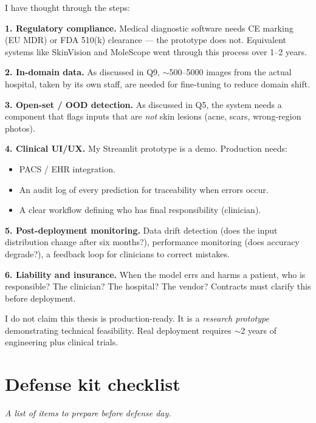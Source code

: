 \documentclass[11pt,a4paper]{article}
\begin{document}
\begin{answer}
I have thought through the steps:

\textbf{1. Regulatory compliance.} Medical diagnostic software needs CE marking (EU MDR) or FDA 510(k) clearance --- the prototype does not. Equivalent systems like SkinVision and MoleScope went through this process over 1--2 years.

\textbf{2. In-domain data.} As discussed in Q9, $\sim$500--5000 images from the actual hospital, taken by its own staff, are needed for fine-tuning to reduce domain shift.

\textbf{3. Open-set / OOD detection.} As discussed in Q5, the system needs a component that flags inputs that are \textit{not} skin lesions (acne, scars, wrong-region photos).

\textbf{4. Clinical UI/UX.} My Streamlit prototype is a demo. Production needs:
\begin{itemize}[leftmargin=*]
  \item PACS / EHR integration.
  \item An audit log of every prediction for traceability when errors occur.
  \item A clear workflow defining who has final responsibility (clinician).
\end{itemize}

\textbf{5. Post-deployment monitoring.} Data drift detection (does the input distribution change after six months?), performance monitoring (does accuracy degrade?), a feedback loop for clinicians to correct mistakes.

\textbf{6. Liability and insurance.} When the model errs and harms a patient, who is responsible? The clinician? The hospital? The vendor? Contracts must clarify this before deployment.

I do not claim this thesis is production-ready. It is a \textit{research prototype} demonstrating technical feasibility. Real deployment requires $\sim$2 years of engineering plus clinical trials.
\end{answer}

\section{Defense kit checklist}

\textit{A list of items to prepare before defense day.}
\end{document}
